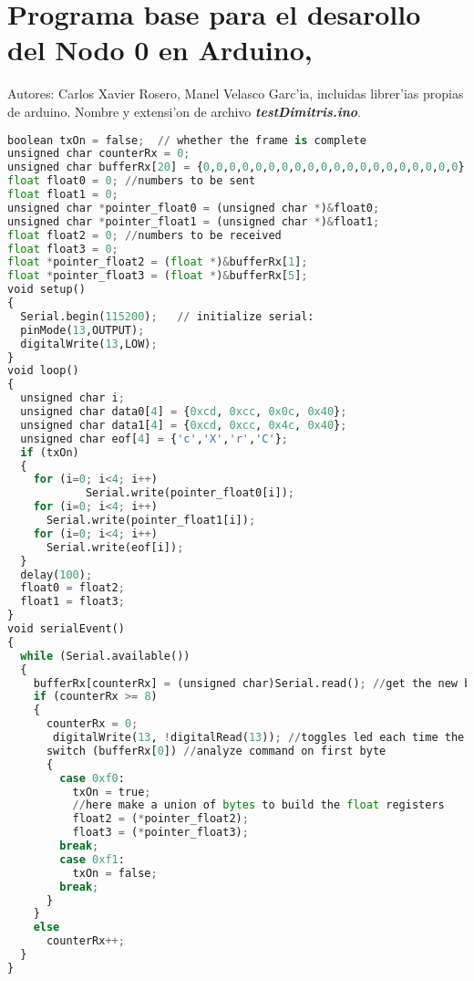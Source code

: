 \chapter{\normalsize Programa base para el desarollo del Nodo 0 en Arduino,}
\vspace{0cm}
Autores: Carlos Xavier Rosero, Manel Velasco Garc'ia, incluidas librer'ias propias de arduino. Nombre y extensi'on de archivo \textit{\textbf{testDimitris.ino}}.

 {\tiny


\begin{lstlisting}[language=python]
boolean txOn = false;  // whether the frame is complete
unsigned char counterRx = 0;
unsigned char bufferRx[20] = {0,0,0,0,0,0,0,0,0,0,0,0,0,0,0,0,0,0,0,0};
float float0 = 0; //numbers to be sent
float float1 = 0;
unsigned char *pointer_float0 = (unsigned char *)&float0;
unsigned char *pointer_float1 = (unsigned char *)&float1;
float float2 = 0; //numbers to be received
float float3 = 0;
float *pointer_float2 = (float *)&bufferRx[1];
float *pointer_float3 = (float *)&bufferRx[5];
void setup()
{
  Serial.begin(115200);   // initialize serial:
  pinMode(13,OUTPUT);
  digitalWrite(13,LOW);
}
void loop()
{
  unsigned char i; 
  unsigned char data0[4] = {0xcd, 0xcc, 0x0c, 0x40};
  unsigned char data1[4] = {0xcd, 0xcc, 0x4c, 0x40};
  unsigned char eof[4] = {'c','X','r','C'};
  if (txOn)
  {
    for (i=0; i<4; i++)
			Serial.write(pointer_float0[i]);
    for (i=0; i<4; i++)
      Serial.write(pointer_float1[i]);
    for (i=0; i<4; i++)
      Serial.write(eof[i]);
  }
  delay(100);
  float0 = float2;
  float1 = float3;
}
void serialEvent()
{
  while (Serial.available())
  {
    bufferRx[counterRx] = (unsigned char)Serial.read(); //get the new byte
    if (counterRx >= 8)
    {
      counterRx = 0;
       digitalWrite(13, !digitalRead(13)); //toggles led each time the buffer is 9 bytes long
      switch (bufferRx[0]) //analyze command on first byte
      {
        case 0xf0:
          txOn = true;
          //here make a union of bytes to build the float registers
          float2 = (*pointer_float2);
          float3 = (*pointer_float3);           
        break;
        case 0xf1:
          txOn = false;
        break;
      } 
    }
    else
      counterRx++;
  }
}
\end{lstlisting}

}

